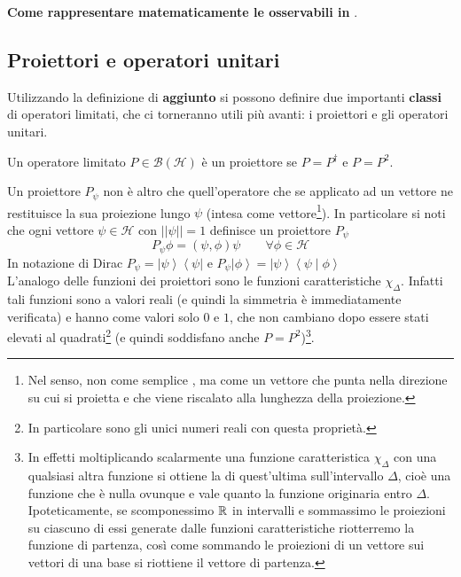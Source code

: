 %

%
\textbf{Come rappresentare matematicamente le osservabili in \MQ}.\\


\subsection{Proiettori e operatori unitari}
Utilizzando la definizione di \textbf{aggiunto} si possono definire due importanti \textbf{classi} di operatori limitati, che ci torneranno utili più avanti: i proiettori e gli operatori unitari.
\begin{dfn}[Proiettore]
 Un operatore limitato $P\in\mathcal{B}(\mathcal{H})$ è un proiettore se $P=P^\dag$ e $P=P^2$.
\end{dfn}
Un proiettore $P_\psi$ non è altro che quell'operatore che se applicato ad un vettore ne restituisce la sua proiezione lungo $\psi$ (intesa come vettore\footnote{Nel senso, non come semplice , ma come un vettore che punta nella direzione su cui si proietta e che viene riscalato alla lunghezza della proiezione.}).
In particolare si noti che ogni vettore $\psi\in\mathcal{H}$ con $\left|\left|\psi\right|\right|=1$ definisce un proiettore $P_\psi$
\begin{equation}
P_\psi\phi=\left(\psi,\phi\right)\psi\qquad \forall\phi\in\mathcal{H}
\label{eqn:proiettore}
\end{equation}
In notazione di Dirac $P_\psi=\left|\psi\right\rangle\left\langle\psi\right|$ e $P_\psi\left|\phi\right\rangle=\left|\psi\right\rangle\left\langle\psi\middle|\phi\right\rangle$\\
L'analogo delle funzioni dei proiettori sono le funzioni caratteristiche $\chi_\Delta$. Infatti tali funzioni sono a valori reali (e quindi la simmetria è immediatamente verificata) e hanno come valori solo $0$ e $1$, che non cambiano dopo essere stati elevati al quadrati\footnote{In particolare sono gli unici numeri reali con questa proprietà.} (e quindi soddisfano anche $P=P^2$)\footnote{In effetti moltiplicando scalarmente una funzione caratteristica $\chi_\Delta$ con una qualsiasi altra funzione si ottiene la  di quest'ultima sull'intervallo $\Delta$, cioè una funzione che è nulla ovunque e vale quanto la funzione originaria entro $\Delta$. Ipoteticamente, se scomponessimo $\mathbb{R}$ in intervalli e sommassimo le proiezioni su ciascuno di essi generate dalle funzioni caratteristiche riotterremo la funzione di partenza, così come sommando le proiezioni di un vettore sui vettori di una base si riottiene il vettore di partenza.}.

